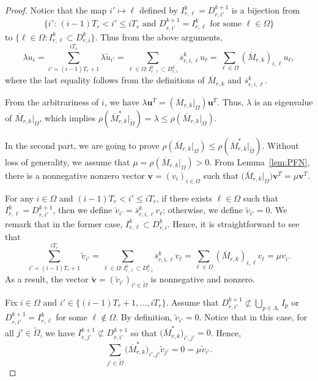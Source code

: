 \documentclass[11pt]{amsart}
\theoremstyle{definition}
\theoremstyle{remark}
\numberwithin{equation}{section}
\newcommand{\bfu}{{\mathbf u}}
\newcommand{\bfv}{{\mathbf v}}
\newcommand{\I}{{\mathcal I}}
\newcommand{\upM}{{\overline{M}}}
\newcommand{\ups}{{\overline{s} }}
\def\wdt{\widetilde}
\begin{document}
\begin{proof}

Notice that the map
$i'\mapsto \ell$ defined by $I^{k}_{r,\ell}=D^{k+1}_{r,i'}$ is a bijection from 
\[
\big\{i':\, (i-1)T_r<i'\leq iT_r \mbox{ and } D_{r,i'}^{k+1}=I_{r,\ell}^k \mbox{ for some } \ell\in \Omega\big\}
\] 
to $\{\ell\in \Omega: I_{r,\ell}^k \subset D_{r,i}^k \}$. Thus from the above arguments, 
\[
  \lambda {u}_i=\sum_{i'=(i-1)T_r+1}^{iT_r} \lambda \wdt{u}_{i'}=\sum_{\ell\in \Omega: I_{r,\ell}^k \subset D_{r,i}^k} \ups_{r,i,\ell}^k u_{\ell}=
   \sum_{\ell\in \Omega} (\upM_{r,k})_{i,\ell}  u_{\ell},
\]
where the last equality follows from the definitions of $\upM_{r,k}$ and $\ups_{r,i,\ell}^k$.


From the arbitrariness of $i$, we have $\lambda \bfu^T=(\upM_{r,k} |_\Omega) \bfu^T$.
Thus, $\lambda$ is an eigenvalue of $\upM_{r,k}|_\Omega $, which implies $\rho(\upM_{r,k}^* |_{\wdt{\Omega}} )=\lambda \leq \rho(\upM_{r,k}|_\Omega)$.


In the second part, we are going to prove $\rho(\upM_{r,k}|_\Omega)\leq \rho(\upM_{r,k}^* |_{\wdt{\Omega}})$. Without loss of generality, we assume that 
$\mu=\rho(\upM_{r,k}|_\Omega)>0$. 
From Lemma~\ref{lem:PFN}, there is a nonnegative nonzero vector $\bfv=(v_i)_{i\in\Omega}$ such that $\big( \upM_{r,k} |_\Omega \big)\bfv^T =\mu \bfv^T$.

For any $i\in \Omega$ and $(i-1)T_r<i'\leq iT_r$, if there exists $\ell \in \Omega$ such that $I_{r,\ell}^k=D_{r,i'}^{k+1}$, then we define $\wdt{v}_{i'}=	\ups_{r,i,\ell}^k v_{\ell}$; otherwise, we define $\wdt{v}_{i'}=0$. We remark that in the former case, $I_{r,\ell}^k\subset D_{r,i}^k$. Hence,
it is straightforward to see that
\begin{equation}\label{eq:3-eigen-vv-sum}
	\sum_{i'=(i-1)T_r+1}^{iT_r} \wdt{v}_{i'}=\sum_{\ell\in \Omega: I_{r,\ell}^k \subset D_{r,i}^k} \ups_{r,i,\ell}^k v_{\ell}=\sum_{\ell\in \Omega} (\upM_{r,k})_{i,\ell}  v_{\ell}=\mu v_i.
\end{equation}
As a result, the vector $\wdt{\bfv}=(\wdt{v}_{i'})_{i'\in\wdt{\Omega}}$ is nonnegative and nonzero.


Fix $i\in\Omega$ and $i'\in\{(i-1)T_r+1,\ldots,iT_r\}$. Assume that $D_{r,i'}^{k+1}\not\subset \bigcup_{p\in \Lambda_r} I_p$ or $D_{r,i'}^{k+1}=I_{r,\ell}^k$ for some $\ell\not\in \Omega$. By definition, $\wdt{v}_{i'}=0$.
Notice that in this case, for all $j'\in \wdt{\Omega}$, we have $I^{k+1}_{r,j'}\not\subset D_{r,i'}^{k+1}$ so that $\big(\upM_{r,k}^*\big)_{i',j'}=0$. Hence, 
\[
\sum_{j'\in \wdt{\Omega}} \big(\upM_{r,k}^*\big)_{i',j'} \wdt{v}_{j'}=0=\mu \wdt{v}_{i'}.
\]


\end{proof}
\end{document}
